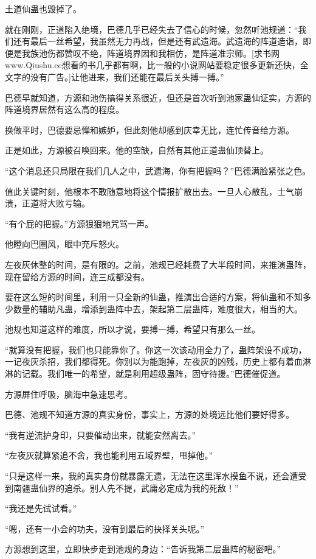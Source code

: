 \begin{this_body}
土道仙蛊也毁掉了。

就在刚刚，正道陷入绝境，巴德几乎已经失去了信心的时候，忽然听池规道：“我们还有最后一丝希望，我虽然无力再战，但是还有武遗海。武遗海的阵道造诣，即便是我族池伤都赞叹不绝，阵道境界因和我相仿，是阵道准宗师。[求书网www.Qiushu.cc想看的书几乎都有啊，比一般的小说网站要稳定很多更新还快，全文字的没有广告。]让他进来，我们还能在最后关头搏一搏。”

巴德早就知道，方源和池伤搞得关系很近，但还是首次听到池家蛊仙证实，方源的阵道境界居然有这么高的程度。

换做平时，巴德要忌惮和嫉妒，但此刻他却感到庆幸无比，连忙传音给方源。

正是如此，方源被召唤回来。他的空缺，自然有其他正道蛊仙顶替上。

“这个消息还只局限在我们几人之中，武遗海，你有把握吗？”巴德满脸紧张之色。

值此关键时刻，他根本不敢随意地将这个情报扩散出去。一旦人心散乱，士气崩溃，正道将大败亏输。

“有个屁的把握。”方源狠狠地咒骂一声。

他瞪向巴圈风，眼中充斥怒火。

左夜灰休整的时间，是有限的。之前，池规已经耗费了大半段时间，来推演蛊阵，现在留给方源的时间，连三成都没有。

要在这么短的时间里，利用一只全新的仙蛊，推演出合适的方案，将仙蛊和不知多少数量的辅助凡蛊，增添到蛊阵中去，架起第二层蛊阵，难度很大，相当的大。

池规也知道这样的难度，所以才说，要搏一搏，希望只有那么一丝。

“就算没有把握，我们也只能靠你了。你这一次该动用全力了，蛊阵架设不成功，一记夜灰杀招，我们都得死。你别以为能跑掉，左夜灰的凶残，历史上都有着血淋淋的记载。我们唯一的希望，就是利用超级蛊阵，固守待援。”巴德催促道。

方源屏住呼吸，脑海中急速思考。

巴德、池规不知道方源的真实身份，事实上，方源的处境远比他们要好得多。

“我有逆流护身印，只要催动出来，就能安然离去。”

“左夜灰就算紧追不舍，我也能利用五域界壁，甩掉他。”

“只是这样一来，我的真实身份就暴露无遗，无法在这里浑水摸鱼不说，还会遭受到南疆蛊仙界的追杀。别人先不提，武庸必定成为我的死敌！”

“我还是先试试看。”

“嗯，还有一小会的功夫，没有到最后的抉择关头呢。”

方源想到这里，立即快步走到池规的身边：“告诉我第二层蛊阵的秘密吧。”


\end{this_body}
